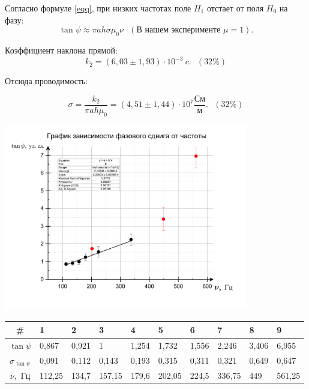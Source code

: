 \documentclass[a4paper,12pt]{article}
\theoremstyle{plain} %
\theoremstyle{definition} %
\theoremstyle{remark} %
\begin{document}
			Согласно формуле \eqref{eqq}, при низких частотах поле $H_1$  отстает от поля $H_0$ на фазу:
	\begin{equation*}
		\tan \psi \approx \pi a h \sigma \mu_0 \nu  \ \ \ (\text{В нашем эксперименте } \mu = 1).
	\end{equation*}
	
	Коэффициент наклона прямой:
	\begin{equation}
		k_2 = (6,03 \pm 1,93) \cdot 10^{-3} \ c. \ \ \ (32 \%)
	\end{equation}
	
	Отсюда проводимость:
	
	\begin{equation}
		\sigma = \frac{k_2}{\pi a h \mu_0} = (4,51 \pm 1,44) \cdot 10^7  \frac{\text{См}}{\text{м}}. \ \ \ (32\%)
	\end{equation}
	
		\includegraphics[width = 0.8\textwidth]{psi1}
		
				\begin{table}[h]
			\begin{tabularx}{\textwidth}{|c|Y|Y|Y|Y|Y|Y|Y|Y|Y|}
				\hline
				\# & 1 & 2 & 3 & 4 & 5 & 6 & 7 & 8 & 9 \\
				\hline
			$	\tan\psi$& 0,867 &			0,921&			1&			1,254&			1,732&			1,556&			2,246&			3,406&			6,955	\\ \hline
			$\sigma_{\tan \psi}$ & 0,091&			0,112&			0,143&			0,193&			0,315&			0,311&			0,321&			0,649&			0,647 \\ \hline
				$\nu, \text{ Гц}$ &112,25&				134,7&				157,15&				179,6&				202,05&				224,5&				336,75&				449&				561,25	 \\ \hline
	
			\end{tabularx}
			\label{tab:my-table2}
		\end{table}
		
\end{document}
